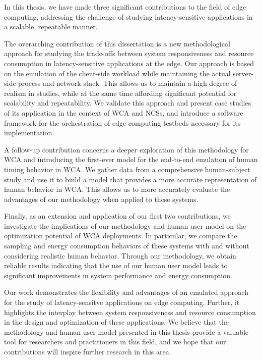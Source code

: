 
In this thesis, we have made three significant contributions to the field of edge computing, addressing the challenge of studying latency-sensitive applications in a scalable, repeatable manner.

The overarching contribution of this dissertation is a new methodological approach for studying the trade-offs between system responsiveness and resource consumption in latency-sensitive applications at the edge.
Our approach is based on the emulation of the client-side workload while maintaining the actual server-side process and network stack.
This allows us to maintain a high degree of realism in studies, while at the same time affording significant potential for scalability and repeatability.
We validate this approach and present case studies of its application in the context of \gls{WCA} and \glspl{NCS}, and introduce a software framework for the orchestration of edge computing testbeds necessary for its implementation.

A follow-up contribution concerns a deeper exploration of this methodology for \gls{WCA} and introducing the first-ever model for the end-to-end emulation of human timing behavior in \gls{WCA}.
We gather data from a comprehensive human-subject study and use it to build a model that provides a more accurate representation of human behavior in \gls{WCA}.
This allows us to more accurately evaluate the advantages of our methodology when applied to these systems.

Finally, as an extension and application of our first two contributions, we investigate the implications of our methodology and human user model on the optimization potential of \gls{WCA} deployments.
In particular, we compare the sampling and energy consumption behaviors of these systems with and without considering realistic human behavior.
Through our methodology, we obtain reliable results indicating that the use of our human user model leads to significant improvements in system performance and energy consumption.

Our work demonstrates the flexibility and advantages of an emulated approach for the study of latency-sensitve applications on edge computing.
Further, it highlights the interplay between system responsiveness and resource consumption in the design and optimization of these applications.
We believe that the methodology and human user model presented in this thesis provide a valuable tool for researchers and practitioners in this field, and we hope that our contributions will inspire further research in this area.


